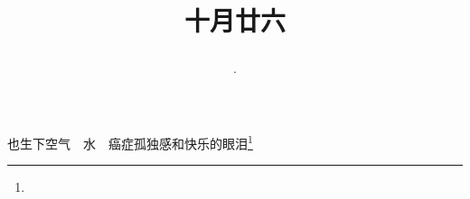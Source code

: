 \title{\date[d=26,m=11,y=2024][year:cn-y,年,month:cn,day:cn,日,·,weekday]·十月廿六 }
也生下空气　水　癌症孤独感和快乐的眼泪\footnote{ }


